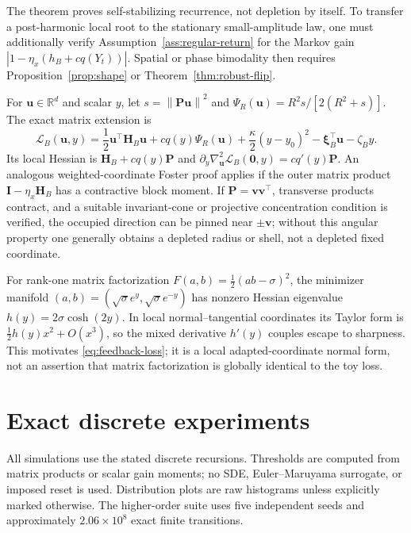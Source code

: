 \documentclass[10pt]{article}
\theoremstyle{definition}
\theoremstyle{remark}
\newcommand{\R}{\mathbb R}
\newcommand{\norm}[1]{\left\lVert#1\right\rVert}
\newcommand{\Id}{\mathbf I}
\newcommand{\uvec}{\mathbf u}
\newcommand{\vvec}{\mathbf v}
\newcommand{\Hvec}{\mathbf H}
\newcommand{\xivec}{\boldsymbol\xi}
\begin{document}
The theorem proves self-stabilizing recurrence, not depletion by itself.
To transfer a post-harmonic local root to the stationary small-amplitude law,
one must additionally verify Assumption~\ref{ass:regular-return} for the
Markov gain $|1-\eta_x(h_B+cq(Y_t))|$.  Spatial or phase bimodality then
requires Proposition~\ref{prop:shape} or Theorem~\ref{thm:robust-flip}.

For $\uvec\in\R^d$ and scalar $y$, let
$s=\norm{\mathbf P\uvec}^2$ and
$\Psi_R(\uvec)=R^2s/[2(R^2+s)]$.  The exact matrix extension is
\begin{equation}
 \mathcal L_B(\uvec,y)=\frac12\uvec^\top\Hvec_B\uvec
 +cq(y)\Psi_R(\uvec)+\frac\kappa2(y-y_0)^2
 -\xivec_B^\top\uvec-\zeta_By .
 \label{eq:matrix-feedback}
\end{equation}
Its local Hessian is $\Hvec_B+cq(y)\mathbf P$ and
$\partial_y\nabla_{\uvec}^2\mathcal L_B(\mathbf0,y)=cq'(y)\mathbf P$.
An analogous weighted-coordinate Foster proof applies if the outer matrix
product $\Id-\eta_x\Hvec_B$ has a contractive block moment.
If $\mathbf P=\vvec\vvec^\top$, transverse products contract, and a suitable
invariant-cone or projective concentration condition is verified, the occupied
direction can be pinned near $\pm\vvec$; without this angular
property one generally obtains a depleted radius or shell, not a depleted
fixed coordinate.

For rank-one matrix factorization
$F(a,b)=\frac12(ab-\sigma)^2$, the minimizer manifold
$(a,b)=(\sqrt\sigma e^y,\sqrt\sigma e^{-y})$ has nonzero Hessian eigenvalue
$h(y)=2\sigma\cosh(2y)$.  In local normal--tangential coordinates its Taylor
form is $\frac12h(y)x^2+O(x^3)$, so the mixed derivative $h'(y)$ couples
escape to sharpness.  This motivates \eqref{eq:feedback-loss}; it is a local
adapted-coordinate normal form, not an assertion that matrix factorization
is globally identical to the toy loss.

\section{Exact discrete experiments}
\label{sec:experiments}

All simulations use the stated discrete recursions.  Thresholds are computed
from matrix products or scalar gain moments; no SDE, Euler--Maruyama surrogate,
or imposed reset is used.  Distribution plots are raw histograms unless
explicitly marked otherwise.  The higher-order suite uses five independent
seeds and approximately $2.06\times10^8$ exact finite transitions.
\end{document}
